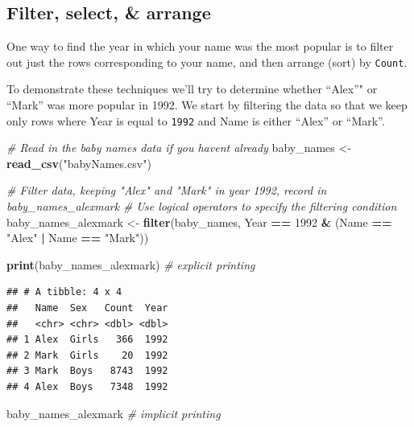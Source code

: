 \documentclass[
]{book}
\newenvironment{Shaded}{\begin{snugshade}}{\end{snugshade}}
\newcommand{\CommentTok}[1]{\textcolor[rgb]{0.56,0.35,0.01}{\textit{#1}}}
\newcommand{\DecValTok}[1]{\textcolor[rgb]{0.00,0.00,0.81}{#1}}
\newcommand{\KeywordTok}[1]{\textcolor[rgb]{0.13,0.29,0.53}{\textbf{#1}}}
\newcommand{\NormalTok}[1]{#1}
\newcommand{\OperatorTok}[1]{\textcolor[rgb]{0.81,0.36,0.00}{\textbf{#1}}}
\newcommand{\StringTok}[1]{\textcolor[rgb]{0.31,0.60,0.02}{#1}}
\begin{document}
\hypertarget{filter-select-arrange}{%
\subsection{Filter, select, \& arrange}\label{filter-select-arrange}}

One way to find the year in which your name was the most popular
is to filter out just the rows corresponding to your name, and
then arrange (sort) by \texttt{Count}.

To demonstrate these techniques we'll try to determine whether
``Alex''" or ``Mark'' was more popular in 1992. We start by filtering the
data so that we keep only rows where Year is equal to \texttt{1992} and Name is
either ``Alex'' or ``Mark''.

\begin{Shaded}
\begin{Highlighting}[]
\CommentTok{\# Read in the baby names data if you haven\textquotesingle{}t already}
\NormalTok{baby\_names \textless{}{-}}\StringTok{ }\KeywordTok{read\_csv}\NormalTok{(}\StringTok{"babyNames.csv"}\NormalTok{)}
\end{Highlighting}
\end{Shaded}

\begin{Shaded}
\begin{Highlighting}[]
\CommentTok{\# Filter data, keeping "Alex" and "Mark" in year 1992, record in baby\_names\_alexmark}
\CommentTok{\# Use logical operators to specify the filtering condition}
\NormalTok{baby\_names\_alexmark \textless{}{-}}\StringTok{ }\KeywordTok{filter}\NormalTok{(baby\_names, }
\NormalTok{             Year }\OperatorTok{==}\StringTok{ }\DecValTok{1992} \OperatorTok{\&}\StringTok{ }\NormalTok{(Name }\OperatorTok{==}\StringTok{ "Alex"} \OperatorTok{|}\StringTok{ }\NormalTok{Name }\OperatorTok{==}\StringTok{ "Mark"}\NormalTok{))}

\KeywordTok{print}\NormalTok{(baby\_names\_alexmark) }\CommentTok{\# explicit printing}
\end{Highlighting}
\end{Shaded}

\begin{verbatim}
## # A tibble: 4 x 4
##   Name  Sex   Count  Year
##   <chr> <chr> <dbl> <dbl>
## 1 Alex  Girls   366  1992
## 2 Mark  Girls    20  1992
## 3 Mark  Boys   8743  1992
## 4 Alex  Boys   7348  1992
\end{verbatim}

\begin{Shaded}
\begin{Highlighting}[]
\NormalTok{baby\_names\_alexmark }\CommentTok{\# implicit printing}
\end{Highlighting}
\end{Shaded}
\end{document}
